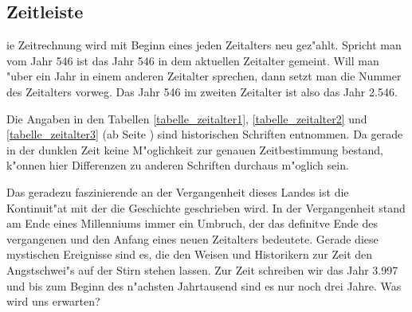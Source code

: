 \subsection{Zeitleiste}
ie Zeitrechnung wird mit Beginn eines jeden Zeitalters
neu gez"ahlt. Spricht man vom Jahr 546 ist das Jahr 546 in dem
aktuellen Zeitalter gemeint. Will man "uber ein Jahr in einem
anderen Zeitalter sprechen, dann setzt man die Nummer des Zeitalters
vorweg. Das Jahr 546 im zweiten Zeitalter ist also das Jahr 2.546.
\par Die Angaben in den Tabellen \ref{tabelle_zeitalter1},
\ref{tabelle_zeitalter2} und \ref{tabelle_zeitalter3} (ab Seite
\pageref{tabelle_zeitalter1}) sind historischen Schriften entnommen.
Da gerade in der dunklen Zeit keine M"oglichkeit zur genauen
Zeitbestimmung bestand, k"onnen hier Differenzen zu anderen
Schriften durchaus m"oglich sein.
\par Das geradezu faszinierende an der Vergangenheit dieses
Landes ist die Kontinuit"at mit der die Geschichte geschrieben wird.
In der Vergangenheit stand am Ende eines Millenniums immer ein
Umbruch, der das definitve Ende des vergangenen und den Anfang eines
neuen Zeitalters bedeutete. Gerade diese mystischen Ereignisse sind
es, die den Weisen und Historikern zur Zeit den Angstschwei"s auf
der Stirn stehen lassen. Zur Zeit schreiben wir das Jahr 3.997 und
bis zum Beginn des n"achsten Jahrtausend sind es nur noch drei
Jahre. Was wird uns erwarten?

